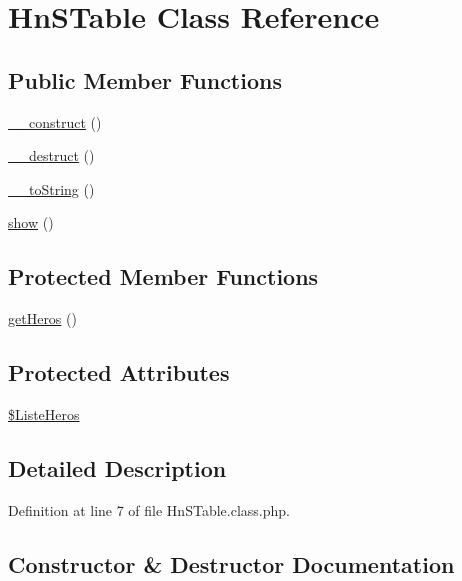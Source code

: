 \hypertarget{class_hn_s_table}{}\section{Hn\+S\+Table Class Reference}
\label{class_hn_s_table}
\subsection*{Public Member Functions}
\begin{DoxyCompactItemize}
\item 
\hyperlink{class_hn_s_table_a351eae2ab4dcd8fcb12d310666372177}{\+\_\+\+\_\+construct} ()
\item 
\hyperlink{class_hn_s_table_ab960a63d8ef9e904bb1de0eb82a6092f}{\+\_\+\+\_\+destruct} ()
\item 
\hyperlink{class_hn_s_table_ad8c27691481cf504e4c9e0a63f9aa6e9}{\+\_\+\+\_\+to\+String} ()
\item 
\hyperlink{class_hn_s_table_a058cf0aad867aeac9886b190f8815b37}{show} ()
\end{DoxyCompactItemize}
\subsection*{Protected Member Functions}
\begin{DoxyCompactItemize}
\item 
\hyperlink{class_hn_s_table_a033a22727cb8e44dd8d8d874482d2258}{get\+Heros} ()
\end{DoxyCompactItemize}
\subsection*{Protected Attributes}
\begin{DoxyCompactItemize}
\item 
\hyperlink{class_hn_s_table_a867b6ad4ad3ca94b95a727a21ca73d9f}{\$\+Liste\+Heros}
\end{DoxyCompactItemize}


\subsection{Detailed Description}


Definition at line 7 of file Hn\+S\+Table.\+class.\+php.



\subsection{Constructor \& Destructor Documentation}
\mbox{\label{class_hn_s_table_a351eae2ab4dcd8fcb12d310666372177}} 
